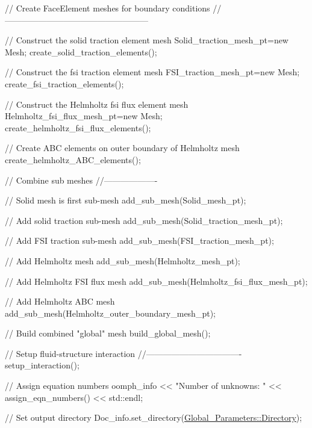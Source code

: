 \begin{DoxyCodeInclude}
 \textcolor{comment}{// Create FaceElement meshes for boundary conditions}
 \textcolor{comment}{//---------------------------------------------------}

 \textcolor{comment}{// Construct the solid traction element mesh}
 Solid\_traction\_mesh\_pt=\textcolor{keyword}{new} Mesh;
 create\_solid\_traction\_elements(); 

 \textcolor{comment}{// Construct the fsi traction element mesh}
 FSI\_traction\_mesh\_pt=\textcolor{keyword}{new} Mesh;
 create\_fsi\_traction\_elements(); 

 \textcolor{comment}{// Construct the Helmholtz fsi flux element mesh}
 Helmholtz\_fsi\_flux\_mesh\_pt=\textcolor{keyword}{new} Mesh;
 create\_helmholtz\_fsi\_flux\_elements();

 \textcolor{comment}{// Create ABC elements on outer boundary of Helmholtz mesh}
 create\_helmholtz\_ABC\_elements();


 \textcolor{comment}{// Combine sub meshes}
 \textcolor{comment}{//-------------------}

 \textcolor{comment}{// Solid mesh is first sub-mesh}
 add\_sub\_mesh(Solid\_mesh\_pt);

 \textcolor{comment}{// Add solid traction sub-mesh}
 add\_sub\_mesh(Solid\_traction\_mesh\_pt);

 \textcolor{comment}{// Add FSI traction sub-mesh}
 add\_sub\_mesh(FSI\_traction\_mesh\_pt);

 \textcolor{comment}{// Add Helmholtz mesh}
 add\_sub\_mesh(Helmholtz\_mesh\_pt);

 \textcolor{comment}{// Add Helmholtz FSI flux mesh}
 add\_sub\_mesh(Helmholtz\_fsi\_flux\_mesh\_pt);

 \textcolor{comment}{// Add Helmholtz ABC mesh}
 add\_sub\_mesh(Helmholtz\_outer\_boundary\_mesh\_pt); 

 \textcolor{comment}{// Build combined "global" mesh}
 build\_global\_mesh();
 

 \textcolor{comment}{// Setup fluid-structure interaction}
 \textcolor{comment}{//----------------------------------}
 setup\_interaction();

 \textcolor{comment}{// Assign equation  numbers}
 oomph\_info << \textcolor{stringliteral}{"Number of unknowns: "} << assign\_eqn\_numbers() << std::endl; 

 \textcolor{comment}{// Set output directory}
 Doc\_info.set\_directory(\hyperlink{namespaceGlobal__Parameters_a301ab922df72030c660b21328d6caf76}{Global\_Parameters::Directory});


\end{DoxyCodeInclude}
